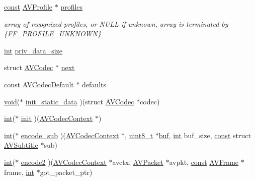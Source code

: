 \begin{DoxyCompactItemize}
\hyperlink{getopt1_8c_a2c212835823e3c54a8ab6d95c652660e}{const} \hyperlink{struct_a_v_profile}{A\+V\+Profile} $\ast$ \hyperlink{struct_a_v_codec_ac832350f2bac582fe3d174e2e3b1eb5e}{profiles}
\begin{DoxyCompactList}\small\item\em array of recognized profiles, or N\+U\+LL if unknown, array is terminated by \{F\+F\+\_\+\+P\+R\+O\+F\+I\+L\+E\+\_\+\+U\+N\+K\+N\+O\+WN\} \end{DoxyCompactList}\item 
\hyperlink{xmltok_8h_a5a0d4a5641ce434f1d23533f2b2e6653}{int} \hyperlink{struct_a_v_codec_aa86c803fcfc0ebb569b15d4645d0e796}{priv\+\_\+data\+\_\+size}
\item 
struct \hyperlink{struct_a_v_codec}{A\+V\+Codec} $\ast$ \hyperlink{struct_a_v_codec_ab423f961a2ce8ef9442010909a29dbf5}{next}
\item 
\hyperlink{getopt1_8c_a2c212835823e3c54a8ab6d95c652660e}{const} \hyperlink{group__lavc__core_ga27561af66de4a75c3da1dc61f8c5cd9a}{A\+V\+Codec\+Default} $\ast$ \hyperlink{struct_a_v_codec_a16e4be8873bd93ac84c7b7d86455d518}{defaults}
\item 
\hyperlink{sound_8c_ae35f5844602719cf66324f4de2a658b3}{void}($\ast$ \hyperlink{struct_a_v_codec_a47f02232b1793c788132d0ca0fd2252a}{init\+\_\+static\+\_\+data} )(struct \hyperlink{struct_a_v_codec}{A\+V\+Codec} $\ast$codec)
\item 
\hyperlink{xmltok_8h_a5a0d4a5641ce434f1d23533f2b2e6653}{int}($\ast$ \hyperlink{struct_a_v_codec_a76f222be1221210dadda60e4fce08e80}{init} )(\hyperlink{struct_a_v_codec_context}{A\+V\+Codec\+Context} $\ast$)
\item 
\hyperlink{xmltok_8h_a5a0d4a5641ce434f1d23533f2b2e6653}{int}($\ast$ \hyperlink{struct_a_v_codec_a5d108464b7461d2e4f1e27ad685c8c2b}{encode\+\_\+sub} )(\hyperlink{struct_a_v_codec_context}{A\+V\+Codec\+Context} $\ast$, \hyperlink{lib-src_2ffmpeg_2win32_2stdint_8h_a9a941819355e6f658991890ff66b4b0e}{uint8\+\_\+t} $\ast$\hyperlink{xlstr_8c_a781718f5b53a876fe91c424c4607fa8f}{buf}, \hyperlink{xmltok_8h_a5a0d4a5641ce434f1d23533f2b2e6653}{int} buf\+\_\+size, \hyperlink{getopt1_8c_a2c212835823e3c54a8ab6d95c652660e}{const} struct \hyperlink{struct_a_v_subtitle}{A\+V\+Subtitle} $\ast$sub)
\item 
\hyperlink{xmltok_8h_a5a0d4a5641ce434f1d23533f2b2e6653}{int}($\ast$ \hyperlink{struct_a_v_codec_ac764e717bb18064de8e4608b8dce5ca4}{encode2} )(\hyperlink{struct_a_v_codec_context}{A\+V\+Codec\+Context} $\ast$avctx, \hyperlink{struct_a_v_packet}{A\+V\+Packet} $\ast$avpkt, \hyperlink{getopt1_8c_a2c212835823e3c54a8ab6d95c652660e}{const} \hyperlink{struct_a_v_frame}{A\+V\+Frame} $\ast$frame, \hyperlink{xmltok_8h_a5a0d4a5641ce434f1d23533f2b2e6653}{int} $\ast$got\+\_\+packet\+\_\+ptr)

\end{DoxyCompactItemize}
